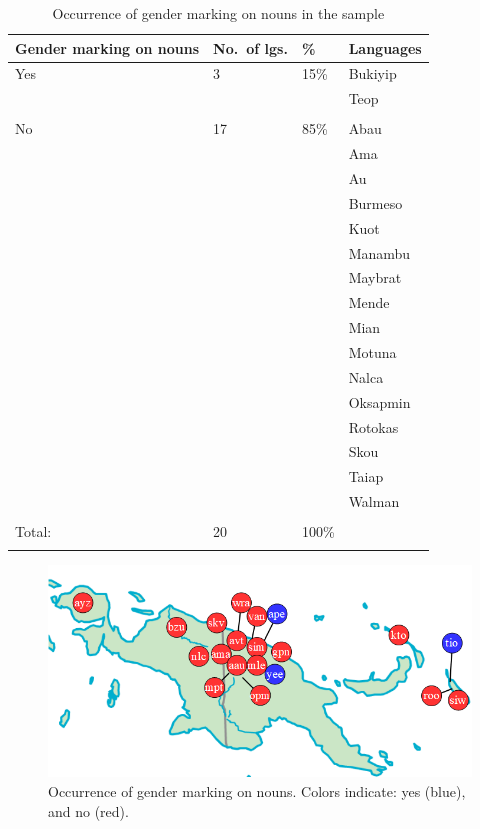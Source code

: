\documentclass[output=collectionpaper]{langsci/langscibook}
\begin{document}
\begin{table}[p]
\small
\begin{tabularx}{\textwidth}{lYYl}
\lsptoprule
Gender marking on nouns & No.\ of lgs. & \% & Languages\\
\midrule
Yes & 3 & 15\% & {Bukiyip} \\
&&&{Teop}                     \\
&&&\\
No & 17 & 85\% & {Abau} \\
&&&{Ama}                   \\
&&&{Au}                    \\
&&&{Burmeso}               \\
&&&{Kuot}                  \\
&&&{Manambu}               \\
&&&{Maybrat}               \\
&&&{Mende}                 \\
&&&{Mian}                  \\
&&&{Motuna}                \\
&&&{Nalca}                 \\
&&&{Oksapmin}              \\
&&&{Rotokas}               \\
&&&{Skou}                  \\
&&&{Taiap}                 \\
&&&{Walman}                \\
&&&\\
\midrule
Total: & 20 & 100\% & \\
\lspbottomrule
\end{tabularx}
\caption{Occurrence of gender marking on nouns in the sample}
\label{tab:Svard:10}
\end{table}


\begin{figure}[p]
\includegraphics[width=.8\textwidth]{figures/09/Simple/fig6.png}
\caption{Occurrence of gender marking on nouns. Colors indicate: yes (blue), and no (red).}
\label{fig:Svard:6}
\end{figure}
\end{document}
